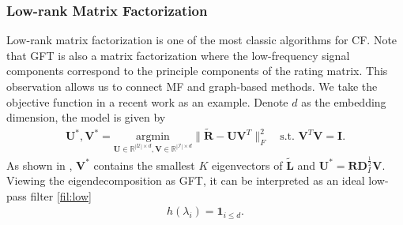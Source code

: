 \documentclass[sigconf]{acmart}
\begin{document}
\subsubsection{Low-rank Matrix Factorization} Low-rank matrix factorization is one of the most classic algorithms for CF. Note that GFT is also a matrix factorization where the low-frequency signal components correspond to the principle components of the rating matrix. This observation allows us to connect MF and graph-based methods. We take the objective function in a recent work \cite{chen2021scalable} as an example. Denote $d$ as the embedding dimension, the model is given by
\begin{align} \label{eq:SGMC}
    \bm{U}^*, \bm{V}^* = \underset{\bm{U} \in \mathbb{R}^{|\mathcal{U}| \times d},\bm{V} \in \mathbb{R}^{|\mathcal{I}| \times d} }{\text{argmin} } \|\tilde{\bm{R}} - \bm{U}\bm{V}^T\|_F^2 \quad \text{s.t. } \bm{V}^T \bm{V} = \bm{I}.  
\end{align}
As shown in \cite{chen2021scalable}, $\bm{V}^*$ contains the smallest $K$ eigenvectors of $\tilde{\bm{L}}$ and $\bm{U}^* = \bm{R}\bm{D}_I^{\frac{1}{2}}\bm{V}$. Viewing the eigendecomposition as GFT, it can be interpreted as an ideal low-pass filter \eqref{fil:low}
\begin{align*}
    h(\lambda_i) = \bm{1}_{i \leq d}.
\end{align*}
\end{document}
